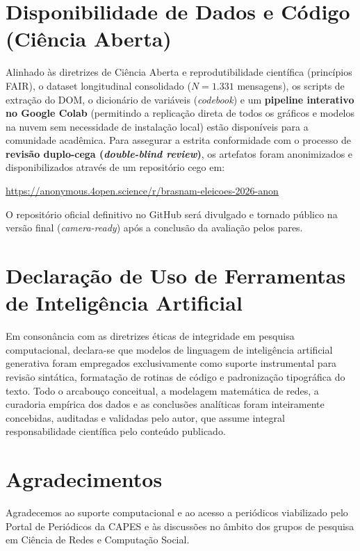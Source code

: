 \documentclass[12pt]{article}
\begin{document}
\section*{Disponibilidade de Dados e Código (Ciência Aberta)}
Alinhado às diretrizes de Ciência Aberta e reprodutibilidade científica (princípios FAIR), o dataset longitudinal consolidado ($N=1.331$ mensagens), os scripts de extração do DOM, o dicionário de variáveis (\textit{codebook}) e um \textbf{pipeline interativo no Google Colab} (permitindo a replicação direta de todos os gráficos e modelos na nuvem sem necessidade de instalação local) estão disponíveis para a comunidade acadêmica. Para assegurar a estrita conformidade com o processo de \textbf{revisão duplo-cega (\textit{double-blind review})}, os artefatos foram anonimizados e disponibilizados através de um repositório cego em:
\begin{center}
\url{https://anonymous.4open.science/r/brasnam-eleicoes-2026-anon}
\end{center}
O repositório oficial definitivo no GitHub será divulgado e tornado público na versão final (\textit{camera-ready}) após a conclusão da avaliação pelos pares.

\section*{Declaração de Uso de Ferramentas de Inteligência Artificial}
Em consonância com as diretrizes éticas de integridade em pesquisa computacional, declara-se que modelos de linguagem de inteligência artificial generativa foram empregados exclusivamente como suporte instrumental para revisão sintática, formatação de rotinas de código e padronização tipográfica do texto. Todo o arcabouço conceitual, a modelagem matemática de redes, a curadoria empírica dos dados e as conclusões analíticas foram inteiramente concebidas, auditadas e validadas pelo autor, que assume integral responsabilidade científica pelo conteúdo publicado.

\section*{Agradecimentos}
Agradecemos ao suporte computacional e ao acesso a periódicos viabilizado pelo Portal de Periódicos da CAPES e às discussões no âmbito dos grupos de pesquisa em Ciência de Redes e Computação Social.



\end{document}
